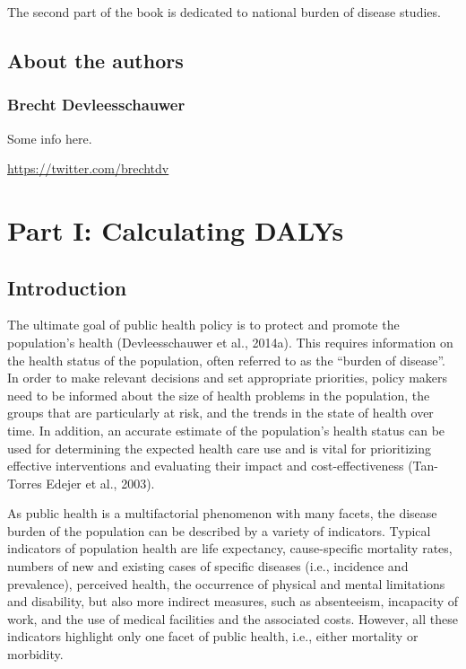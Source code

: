 \documentclass[]{book}
\begin{document}
The second part of the book is dedicated to national burden of disease
studies.

\chapter*{About the authors}\label{about-the-authors}

\section*{Brecht Devleesschauwer}\label{brecht-devleesschauwer}

Some info here.

\url{https://twitter.com/brechtdv}

\part*{Part I: Calculating
DALYs}\label{part-part-i-calculating-dalys}

\chapter{Introduction}\label{introduction}

The ultimate goal of public health policy is to protect and promote the
population's health (Devleesschauwer et al., 2014a). This requires
information on the health status of the population, often referred to as
the ``burden of disease''. In order to make relevant decisions and set
appropriate priorities, policy makers need to be informed about the size
of health problems in the population, the groups that are particularly
at risk, and the trends in the state of health over time. In addition,
an accurate estimate of the population's health status can be used for
determining the expected health care use and is vital for prioritizing
effective interventions and evaluating their impact and
cost-effectiveness (Tan-Torres Edejer et al., 2003).

As public health is a multifactorial phenomenon with many facets, the
disease burden of the population can be described by a variety of
indicators. Typical indicators of population health are life expectancy,
cause-specific mortality rates, numbers of new and existing cases of
specific diseases (i.e., incidence and prevalence), perceived health,
the occurrence of physical and mental limitations and disability, but
also more indirect measures, such as absenteeism, incapacity of work,
and the use of medical facilities and the associated costs. However, all
these indicators highlight only one facet of public health, i.e., either
mortality or morbidity.
\end{document}
